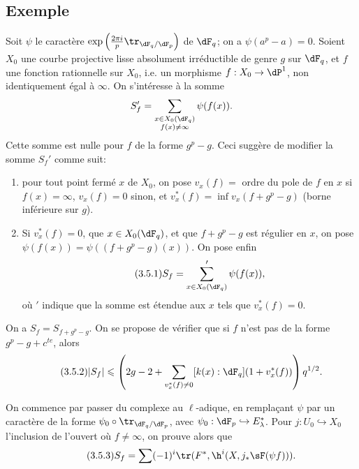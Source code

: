 \subsection{Exemple}\label{VI:3-5}

Soit $\psi$ le caractère 
$\exp\left(\frac{2\pi i}{p} \tr_{\dF_q/\dF_p}\right)$ de $\dF_q$; on a 
$\psi(a^p-a)=0$. Soient $X_0$ une courbe projective lisse absolument 
irréductible de genre $g$ sur $\dF_q$, et $f$ une fonction rationnelle sur 
$X_0$, i.e. un morphisme $f:X_0 \to \dP^1$, non identiquement égal à 
$\infty$. On s'intéresse à la somme 
\[
  S_f' = \sum_{\substack{x\in X_0(\dF_q) \\ f(x)\ne \infty}} \psi(f(x)) 
  \text{.}
\]
Cette somme est nulle pour $f$ de la forme $g^p-g$. Ceci suggère de 
modifier la somme $S_f'$ comme suit: 
\begin{enumerate}[\indent a)]
  \item pour tout point fermé $x$ de $X_0$, on pose $v_x(f) = $ ordre du 
    pole de $f$ en $x$ si $f(x)=\infty$, $v_x(f)=0$ sinon, et 
    $v_x^\ast(f) = \inf v_x(f+g^p-g)$ (borne inférieure sur $g$). 
  \item Si $v_x^\ast(f)=0$, que $x\in X_0(\dF_q)$, et que $f+g^p-g$ est 
    régulier en $x$, on pose $\psi(f(x)) = \psi((f+g^p-g)(x))$. On pose enfin 
\begin{equation*}\tag{3.5.1}\label{VI:eq:3-5-1}
      S_f = \sum'_{x\in X_0(\dF_q)} \psi(f(x)) \text{,}
    \end{equation*}
    où $\prime$ indique que la somme est étendue aux $x$ tels que 
    $v_x^\ast(f)=0$. 
\end{enumerate}

On a $S_f=S_{f+g^p-g}$. On se propose de vérifier que si $f$ n'est pas de la 
forme $g^p-g+c^{t e}$, alors 
\begin{equation*}\tag{3.5.2}\label{VI:eq:3-5-2}
  |S_f|\leqslant \left(2 g-2+\sum_{v_x^\ast(f)\ne 0} [k(x):\dF_q] (1+v_x^\ast(f))\right) q^{1/2} \text{.}
\end{equation*}

On commence par passer du complexe au $\ell$-adique, en remplaçant $\psi$ par 
un caractère de la forme $\psi_0\circ \tr_{\dF_q/\dF_p}$, avec 
$\psi_0:\dF_p\hookrightarrow E_\lambda^\ast$. Pour $j:U_0\hookrightarrow X_0$ 
l'inclusion de l'ouvert où $f\ne\infty$, on prouve alors que 
\begin{equation*}\tag{3.5.3}\label{VI:eq:3-5-3}
  S_f = \sum (-1)^i \tr(F^\ast,\h^i(X,j_\ast \sF(\psi f))) \text{.} 
\end{equation*}

